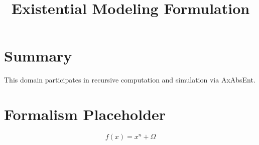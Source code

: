 \documentclass[12pt]{article}
\title{\textbf{Existential Modeling Formulation}}
\begin{document}
\maketitle

\section*{Summary}
This domain participates in recursive computation and simulation via AxAbsEnt.

\section*{Formalism Placeholder}
\[
f(x) = x^n + \Omega
\]
\end{document}
